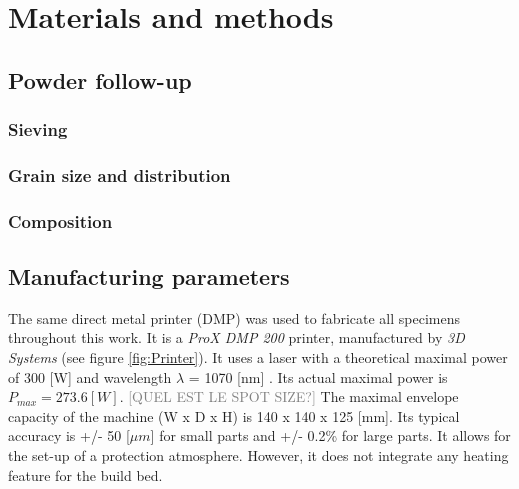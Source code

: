 \chapter{Materials and methods}
\label{Chap3}
\section{Powder follow-up}

\subsection{Sieving}

\subsection{Grain size and distribution}

\subsection{Composition}


\section{Manufacturing parameters}
\label{MMFPP}
The same direct metal printer (DMP) was used to fabricate all specimens throughout this work. It is a \textit{ProX DMP 200} printer, manufactured by \textit{3D Systems} (see figure \ref{fig:Printer}). It uses a laser with a theoretical maximal power of 300 [W] and wavelength $\lambda$ = 1070 [nm] \parencite{3D}. Its actual maximal power is $P_{max}=273.6 [W]$. \textcolor{gray}{[QUEL EST LE SPOT SIZE?]}  The maximal envelope capacity of the machine (W x D x H) is 140 x 140 x 125 [mm]. Its typical accuracy is +/- 50 [$\mu m$] for small parts and +/- 0.2\% for large parts. It allows for the set-up of a protection atmosphere. However, it does not integrate any heating feature for the build bed.\\

